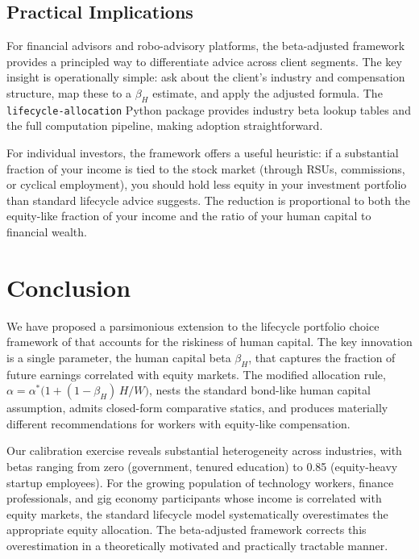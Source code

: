 \documentclass[11pt]{article}
\begin{document}
\subsection{Practical Implications}

For financial advisors and robo-advisory platforms, the beta-adjusted
framework provides a principled way to differentiate advice across client
segments. The key insight is operationally simple: ask about the client's
industry and compensation structure, map these to a $\beta_H$ estimate,
and apply the adjusted formula. The \texttt{lifecycle-allocation} Python
package \citep{lifecycle_allocation} provides industry beta lookup tables
and the full computation pipeline, making adoption straightforward.

For individual investors, the framework offers a useful heuristic: if a
substantial fraction of your income is tied to the stock market (through
RSUs, commissions, or cyclical employment), you should hold less equity
in your investment portfolio than standard lifecycle advice suggests. The
reduction is proportional to both the equity-like fraction of your income
and the ratio of your human capital to financial wealth.


\section{Conclusion}\label{sec:conclusion}

We have proposed a parsimonious extension to the lifecycle portfolio choice
framework of \citet{choi2025} that accounts for the riskiness of human
capital. The key innovation is a single parameter, the human capital beta
$\beta_H$, that captures the fraction of future earnings correlated with
equity markets. The modified allocation rule,
$\alpha = \alpha^{*}\bigl(1 + (1-\beta_H)\,H/W\bigr)$, nests the standard
bond-like human capital assumption, admits closed-form comparative statics,
and produces materially different recommendations for workers with
equity-like compensation.

Our calibration exercise reveals substantial heterogeneity across
industries, with betas ranging from zero (government, tenured education) to
0.85 (equity-heavy startup employees). For the growing population of
technology workers, finance professionals, and gig economy participants
whose income is correlated with equity markets, the standard lifecycle
model systematically overestimates the appropriate equity allocation. The
beta-adjusted framework corrects this overestimation in a theoretically
motivated and practically tractable manner.
\end{document}
